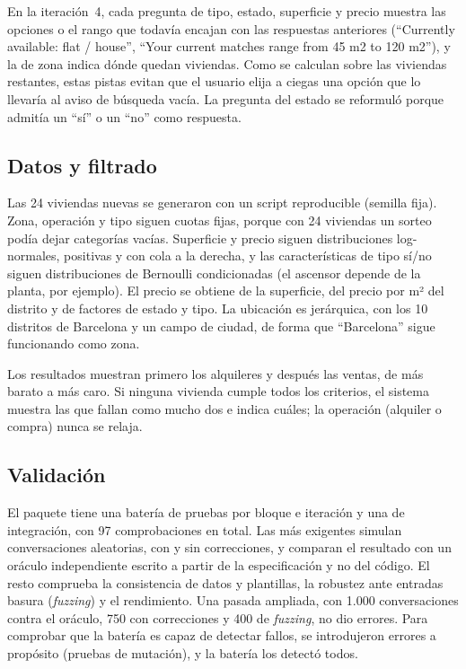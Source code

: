 \documentclass[10pt,a4paper]{article}
\begin{document}
En la iteración~4, cada pregunta de tipo, estado, superficie y precio muestra las opciones o el rango que todavía encajan con las respuestas anteriores (``Currently available: flat / house'', ``Your current matches range from 45 m2 to 120 m2''), y la de zona indica dónde quedan viviendas. Como se calculan sobre las viviendas restantes, estas pistas evitan que el usuario elija a ciegas una opción que lo llevaría al aviso de búsqueda vacía. La pregunta del estado se reformuló porque admitía un ``sí'' o un ``no'' como respuesta.

\subsection{Datos y filtrado}

Las 24 viviendas nuevas se generaron con un script reproducible (semilla fija). Zona, operación y tipo siguen cuotas fijas, porque con 24 viviendas un sorteo podía dejar categorías vacías. Superficie y precio siguen distribuciones log-normales, positivas y con cola a la derecha, y las características de tipo sí/no siguen distribuciones de Bernoulli condicionadas (el ascensor depende de la planta, por ejemplo). El precio se obtiene de la superficie, del precio por m² del distrito y de factores de estado y tipo. La ubicación es jerárquica, con los 10 distritos de Barcelona y un campo de ciudad, de forma que ``Barcelona'' sigue funcionando como zona.

Los resultados muestran primero los alquileres y después las ventas, de más barato a más caro. Si ninguna vivienda cumple todos los criterios, el sistema muestra las que fallan como mucho dos e indica cuáles; la operación (alquiler o compra) nunca se relaja.

\subsection{Validación}

El paquete tiene una batería de pruebas por bloque e iteración y una de integración, con 97 comprobaciones en total. Las más exigentes simulan conversaciones aleatorias, con y sin correcciones, y comparan el resultado con un oráculo independiente escrito a partir de la especificación y no del código. El resto comprueba la consistencia de datos y plantillas, la robustez ante entradas basura (\emph{fuzzing}) y el rendimiento. Una pasada ampliada, con 1.000 conversaciones contra el oráculo, 750 con correcciones y 400 de \emph{fuzzing}, no dio errores. Para comprobar que la batería es capaz de detectar fallos, se introdujeron errores a propósito (pruebas de mutación), y la batería los detectó todos.
\end{document}
